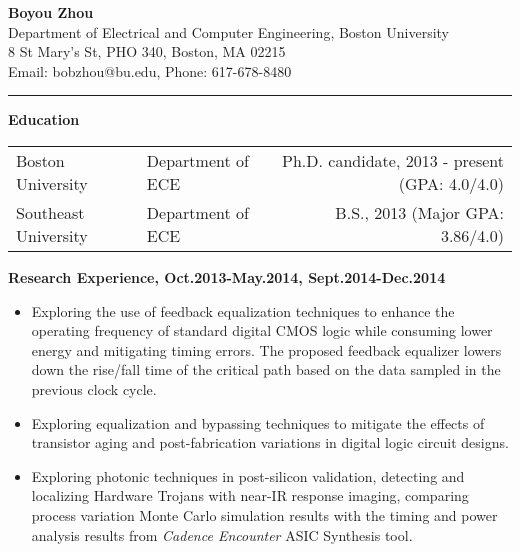 \documentclass[]{article}
\begin{document}
\pagestyle{empty}
\begin{center}
\vspace{-0.2in}
{\large\textbf{Boyou Zhou}}\\
Department of Electrical and Computer Engineering, Boston University\\
8 St Mary's St, PHO 340, Boston, MA 02215\\
Email: bobzhou@bu.edu, Phone: 617-678-8480\\
\rule[-0.1cm]{7.5in}{0.01cm}
\end{center}
%

\textbf{Education}
\vspace{-0.1in}
\begin{table*}[h]
  \begin{tabular}{p{2.0in}p{2.0in}r}
    Boston University& Department of ECE & Ph.D. candidate, 2013 - present
    (GPA: 4.0/4.0)\\ 
    Southeast University & Department of ECE & B.S., 2013
    (Major GPA: 3.86/4.0)\\ 
  \end{tabular}
  \label{tbl:1}
\end{table*}

\vspace{-0.1in}
\noindent \textbf{Research Experience, Oct.2013-May.2014, Sept.2014-Dec.2014}
		\begin{itemize}
            \item Exploring the use of feedback equalization techniques to
            enhance the operating frequency of standard digital CMOS logic
            while consuming lower energy and mitigating timing errors. The
            proposed feedback equalizer lowers down the rise/fall time of
            the critical path based on the data sampled in the previous
            clock cycle. 

            \item Exploring equalization and bypassing techniques to mitigate
            the effects of transistor aging and post-fabrication
            variations in digital logic circuit designs.

            \item Exploring photonic techniques in post-silicon validation,
            detecting and localizing Hardware Trojans with near-IR response
            imaging, comparing process variation Monte Carlo simulation results
            with the timing and power analysis results from \textit{Cadence
            Encounter} ASIC Synthesis tool. 
		\end{itemize}
\end{document}
